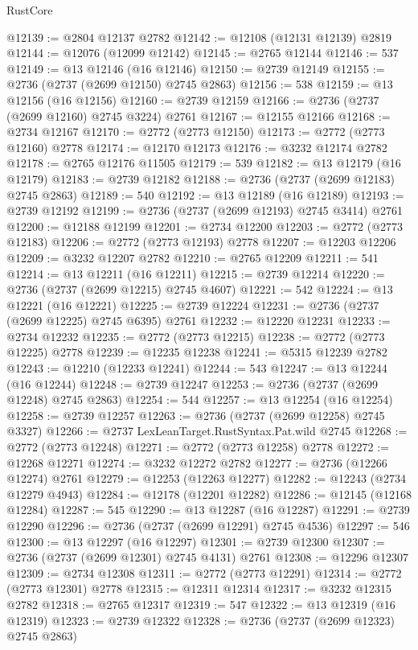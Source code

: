 \begin{lexlean}{RustCore}
\begin{coremodule}
@12139 := @2804 @12137 @2782
@12142 := @12108 (@12131 @12139) @2819
@12144 := @12076 (@12099 @12142)
@12145 := @2765 @12144
@12146 := 537
@12149 := @13 @12146 (@16 @12146)
@12150 := @2739 @12149
@12155 := @2736 (@2737 (@2699 @12150) @2745 @2863)
@12156 := 538
@12159 := @13 @12156 (@16 @12156)
@12160 := @2739 @12159
@12166 := @2736 (@2737 (@2699 @12160) @2745 @3224) @2761
@12167 := @12155 @12166
@12168 := @2734 @12167
@12170 := @2772 (@2773 @12150)
@12173 := @2772 (@2773 @12160) @2778
@12174 := @12170 @12173
@12176 := @3232 @12174 @2782
@12178 := @2765 @12176 @11505
@12179 := 539
@12182 := @13 @12179 (@16 @12179)
@12183 := @2739 @12182
@12188 := @2736 (@2737 (@2699 @12183) @2745 @2863)
@12189 := 540
@12192 := @13 @12189 (@16 @12189)
@12193 := @2739 @12192
@12199 := @2736 (@2737 (@2699 @12193) @2745 @3414) @2761
@12200 := @12188 @12199
@12201 := @2734 @12200
@12203 := @2772 (@2773 @12183)
@12206 := @2772 (@2773 @12193) @2778
@12207 := @12203 @12206
@12209 := @3232 @12207 @2782
@12210 := @2765 @12209
@12211 := 541
@12214 := @13 @12211 (@16 @12211)
@12215 := @2739 @12214
@12220 := @2736 (@2737 (@2699 @12215) @2745 @4607)
@12221 := 542
@12224 := @13 @12221 (@16 @12221)
@12225 := @2739 @12224
@12231 := @2736 (@2737 (@2699 @12225) @2745 @6395) @2761
@12232 := @12220 @12231
@12233 := @2734 @12232
@12235 := @2772 (@2773 @12215)
@12238 := @2772 (@2773 @12225) @2778
@12239 := @12235 @12238
@12241 := @5315 @12239 @2782
@12243 := @12210 (@12233 @12241)
@12244 := 543
@12247 := @13 @12244 (@16 @12244)
@12248 := @2739 @12247
@12253 := @2736 (@2737 (@2699 @12248) @2745 @2863)
@12254 := 544
@12257 := @13 @12254 (@16 @12254)
@12258 := @2739 @12257
@12263 := @2736 (@2737 (@2699 @12258) @2745 @3327)
@12266 := @2737 LexLeanTarget.RustSyntax.Pat.wild @2745
@12268 := @2772 (@2773 @12248)
@12271 := @2772 (@2773 @12258) @2778
@12272 := @12268 @12271
@12274 := @3232 @12272 @2782
@12277 := @2736 (@12266 @12274) @2761
@12279 := @12253 (@12263 @12277)
@12282 := @12243 (@2734 @12279 @4943)
@12284 := @12178 (@12201 @12282)
@12286 := @12145 (@12168 @12284)
@12287 := 545
@12290 := @13 @12287 (@16 @12287)
@12291 := @2739 @12290
@12296 := @2736 (@2737 (@2699 @12291) @2745 @4536)
@12297 := 546
@12300 := @13 @12297 (@16 @12297)
@12301 := @2739 @12300
@12307 := @2736 (@2737 (@2699 @12301) @2745 @4131) @2761
@12308 := @12296 @12307
@12309 := @2734 @12308
@12311 := @2772 (@2773 @12291)
@12314 := @2772 (@2773 @12301) @2778
@12315 := @12311 @12314
@12317 := @3232 @12315 @2782
@12318 := @2765 @12317
@12319 := 547
@12322 := @13 @12319 (@16 @12319)
@12323 := @2739 @12322
@12328 := @2736 (@2737 (@2699 @12323) @2745 @2863)

\end{coremodule}
\end{lexlean}
